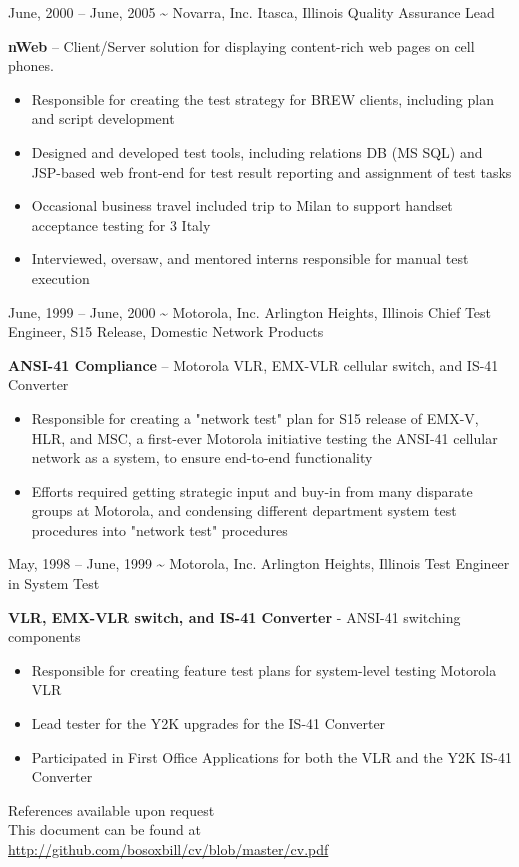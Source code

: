 \documentclass[]{friggeri-cv}
\begin{document}
\begin{entrylist}
     \entryalt
    {June, 2000 -- June, 2005}
    {\textbf{\textasciitilde} Novarra, Inc.}
    {Itasca, Illinois}
    {Quality Assurance Lead}
    {\textbf{nWeb} -- Client/Server solution for displaying content-rich web pages on cell phones.
    \begin{itemize}
      \item Responsible for creating the test strategy for BREW clients, including plan and script development
      \item Designed and developed test tools, including relations DB (MS SQL) and JSP-based web front-end for test result reporting and assignment of test tasks
      \item Occasional business travel included trip to Milan to support handset acceptance testing for 3 Italy
      \item Interviewed, oversaw, and mentored interns responsible for manual test execution
     \end{itemize}}
     
     \entryalt
     {June, 1999 -- June, 2000}
     {\textbf{\textasciitilde} Motorola, Inc.}
     {Arlington Heights, Illinois}
     {Chief Test Engineer, S15 Release, Domestic Network Products}
     {\textbf{ANSI-41 Compliance} -- Motorola VLR, EMX-VLR cellular switch, and IS-41 Converter
     \begin{itemize}
       \item Responsible for creating a "network test" plan for S15 release of EMX-V, HLR, and MSC, a first-ever Motorola initiative testing the ANSI-41 cellular network as a system, to ensure end-to-end functionality
       \item Efforts required getting strategic input and buy-in from many disparate groups at Motorola, and condensing different department system test procedures into "network test" procedures
     \end{itemize}}
       
     \entryalt
     {May, 1998 -- June, 1999}
     {\textbf{\textasciitilde} Motorola, Inc.}
     {Arlington Heights, Illinois}
     {Test Engineer in System Test}
     {\textbf{VLR, EMX-VLR switch, and IS-41 Converter} - ANSI-41 switching components
     \begin{itemize}
       \item Responsible for creating feature test plans for system-level testing Motorola VLR
       \item Lead tester for the Y2K upgrades for the IS-41 Converter
       \item Participated in First Office Applications for both the VLR and the Y2K IS-41 Converter
     \end{itemize}}
     
\end{entrylist} 
References available upon request\\
This document can be found at \href{http://github.com/bosoxbill/cv/blob/master/cv.pdf}{http://github.com/bosoxbill/cv/blob/master/cv.pdf}
\end{document}
